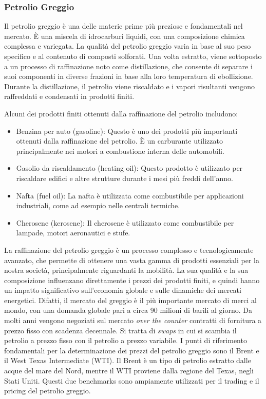 \documentclass[12pt,a4paper]{report}
\begin{document}
\subsubsection{Petrolio Greggio}

Il petrolio greggio è una delle materie prime più preziose e fondamentali nel mercato. È una miscela di idrocarburi liquidi, con una composizione chimica complessa e variegata. La qualità del petrolio greggio varia in base al suo peso specifico e al contenuto di composti solforati.  
Una volta estratto, viene sottoposto a un processo di raffinazione noto come distillazione, che consente di separare i suoi componenti in diverse frazioni in base alla loro temperatura di ebollizione. Durante la distillazione, il petrolio viene riscaldato e i vapori risultanti vengono raffreddati e condensati in prodotti finiti. 

Alcuni dei prodotti finiti ottenuti dalla raffinazione del petrolio includono:

\begin{itemize}
  \item Benzina per auto (gasoline): Questo è uno dei prodotti più importanti ottenuti dalla raffinazione del petrolio. È un carburante utilizzato principalmente nei motori a combustione interna delle automobili.
  \item Gasolio da riscaldamento (heating oil): Questo prodotto è utilizzato per riscaldare edifici e altre strutture durante i mesi più freddi dell'anno.
  \item Nafta (fuel oil): La nafta è utilizzata come combustibile per applicazioni industriali, come ad esempio nelle centrali termiche.
  \item Cherosene (kerosene): Il cherosene è utilizzato come combustibile per lampade, motori aeronautici e stufe.
\end{itemize}

La raffinazione del petrolio greggio è un processo complesso e tecnologicamente avanzato, che permette di ottenere una vasta gamma di prodotti essenziali per la nostra società, principalmente riguardanti la mobilità. La sua qualità e la sua composizione influenzano direttamente i prezzi dei prodotti finiti, e quindi hanno un impatto significativo sull'economia globale e sulle dinamiche dei mercati energetici. Difatti, il mercato del greggio è il più importante mercato di merci al mondo, con una domanda globale pari a circa 90 milioni di barili al giorno. Da molti anni vengono negoziati sul mercato \textit{over the counter} contratti di fornitura a prezzo fisso con scadenza decennale. Si tratta di \textit{swaps} in cui si scambia il petrolio a prezzo fisso con il petrolio a prezzo variabile.
I punti di riferimento fondamentali per la determinazione dei prezzi del petrolio greggio sono il Brent e il West Texas Intermediate (WTI). Il Brent è un tipo di petrolio estratto dalle acque del mare del Nord, mentre il WTI proviene dalla regione del Texas, negli Stati Uniti. Questi due benchmarks sono ampiamente utilizzati per il trading e il pricing del petrolio greggio.
\end{document}
